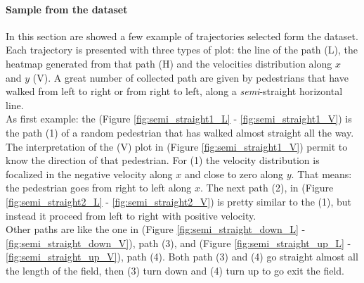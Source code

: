 \documentclass[class=article, crop=false]{standalone}
\begin{document}
\paragraph{Sample from the dataset}
In this section are showed a few example of trajectories selected form the dataset.
Each trajectory is presented with three types of plot: the line of the path (L), the heatmap generated from that path (H) and the velocities distribution along $x$ and $y$ (V).
A great number of collected path are given by pedestrians that have walked from left to right or from right to left, along a \emph{semi}-straight horizontal line.
\\As first example: the (Figure \ref{fig:semi_straight1_L} - \ref{fig:semi_straight1_V}) is the path (1) of a random pedestrian that has walked almost straight all the way.
The interpretation of the (V) plot in (Figure \ref{fig:semi_straight1_V}) permit to know the direction of that pedestrian.
For (1) the velocity distribution is focalized in the negative velocity along $x$ and close to zero along $y$.
That means: the pedestrian goes from right to left along $x$.
The next path (2), in (Figure \ref{fig:semi_straight2_L} - \ref{fig:semi_straight2_V}) is pretty similar to the (1), but instead it proceed from left to right with positive velocity.
\\Other paths are like the one in (Figure \ref{fig:semi_straight_down_L} - \ref{fig:semi_straight_down_V}), path (3), and (Figure \ref{fig:semi_straight_up_L} - \ref{fig:semi_straight_up_V}), path (4).
Both path (3) and (4) go straight almost all the length of the field, then (3) turn down and (4) turn up to go exit the field.
\end{document}
